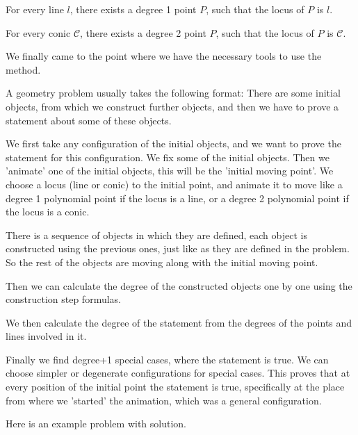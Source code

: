 \documentclass[a4paper]{article}
\begin{document}
\begin{lemma}
    For every line $l$, there exists a degree 1 point $P$, such that the locus of $P$ is $l$.

    For every conic $\mathcal{C}$, there exists a degree 2 point $P$, such that the locus of $P$ is  $\mathcal{C}$.
\end{lemma}

We finally came to the point where we have the necessary tools to use the method.

A geometry problem usually takes the following format: There are some initial objects, from which we construct further objects, and then we have to prove a statement about some of these objects.

We first take any configuration of the initial objects, and we want to prove the statement for this configuration. We fix some of the initial objects. Then we 'animate' one of the initial objects, this will be the 'initial moving point'. We choose a locus (line or conic) to the initial point, and animate it to move like a degree 1 polynomial point if the locus is a line, or a degree 2 polynomial point if the locus is a conic.

There is a sequence of objects in which they are defined, each object is constructed using the previous ones, just like as they are defined in the problem. So the rest of the objects are moving along with the initial moving point.

Then we can calculate the degree of the constructed objects one by one using the construction step formulas.

We then calculate the degree of the statement from the degrees of the points and lines involved in it.

Finally we find degree+1 special cases, where the statement is true. We can choose simpler or degenerate configurations for special cases. This proves that at every position of the initial point the statement is true, specifically at the place from where we 'started' the animation, which was a general configuration.

Here is an example problem with solution.
\end{document}
